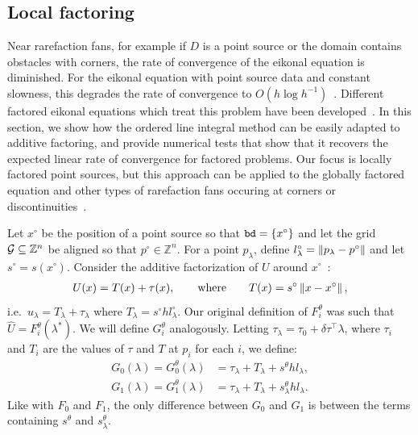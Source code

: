 \documentclass[eikonal.tex]{subfiles}
\begin{document}
\subsection{Local factoring}

Near rarefaction fans, for example if $D$ is a point source or the
domain contains obstacles with corners, the rate of convergence of the
eikonal equation is diminished. For the eikonal equation with point
source data and constant slowness, this degrades the rate of
convergence to $O(h \log h^{-1})$~\cite{qi2018corner}. Different
factored eikonal equations which treat this problem have been
developed~\cite{fomel2009fast,luo2012fast}. In this section, we show
how the ordered line integral method can be easily adapted to additive
factoring, and provide numerical tests that show that it recovers the
expected linear rate of convergence for factored problems. Our focus
is locally factored point sources, but this approach can be applied to
the globally factored equation and other types of rarefaction fans
occuring at corners or discontinuities~\cite{qi2018corner}.

Let $x^\circ$ be the position of a point source so that
$\texttt{bd} = \left\{x^\circ\right\}$ and let the grid
$\mathcal{G} \subseteq \mathbb{Z}^n$ be aligned so that
$p^\circ \in \mathbb{Z}^n$. For a point $p_\lambda$, define
$l^\circ_\lambda = \left\|p_\lambda - p^\circ\right\|$ and let
$s^\circ = s(x^\circ)$. Consider the additive factorization of $U$
around $x^\circ$~\cite{luo2012fast,qi2018corner}:
\begin{align}
  U(x) = T(x) + \tau(x), \qquad \text{where} \qquad T(x) = s^\circ \left\|x - x^\circ\right\|,
\end{align}
i.e.\ $u_\lambda = T_\lambda + \tau_\lambda$ where
$T_\lambda = s^\circ h l^\circ_\lambda$. Our original definition of
$F_i^\theta$ was such that $\hat{U} = F_i^\theta(\lambda^*)$. We will
define $G_i^\theta$ analogously. Letting
$\tau_\lambda = \tau_0 + \delta \tau^\top \lambda$, where $\tau_i$ and
$T_i$ are the values of $\tau$ and $T$ at $p_i$ for each $i$, we
define:
\begin{align}
  \label{eq:Gi}
  G_0(\lambda) = G_0^\theta(\lambda) &= \tau_\lambda + T_\lambda + s^\theta h l_\lambda, \\
  G_1(\lambda) = G_1^\theta(\lambda) &= \tau_\lambda + T_\lambda + s^\theta_\lambda h l_\lambda.
\end{align}
Like with $F_0$ and $F_1$, the only difference between
$G_0$ and $G_1$ is between the terms containing
$s^\theta$ and $s^\theta_\lambda$.
\end{document}
